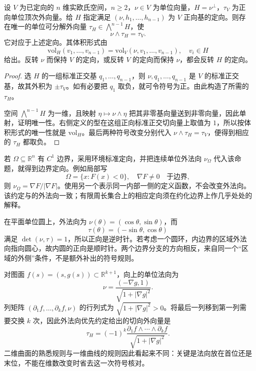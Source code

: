 \begin{proposition}\label{b1:prop:app-b-boundary-orientation}
设 \(V\) 为已定向的 \(n\) 维实欧氏空间，\(n\ge2\)，\(\nu\in V\) 为单位向量，\(H=\nu^\perp\)，\(\tau_V\) 为正向单位顶次外向量。给 \(H\) 指定满足 \((\nu,h_1,\ldots,h_{n-1})\) 为 \(V\) 正向基的定向。则存在唯一的单位可分解外向量
\(\tau_H\in\bigwedge^{n-1}H\)，使
\[
 \nu\wedge\tau_H=\tau_V.
\]
它对应于上述定向。其体积形式由
\[
 \mathrm{vol}_H(v_1,\ldots,v_{n-1})
   =\mathrm{vol}_V(\nu,v_1,\ldots,v_{n-1}),
 \quad v_i\in H
\]
给出。反转 \(\nu\) 而保持 \(V\) 的定向，或反转 \(V\) 的定向而保持 \(\nu\)，都会反转 \(H\) 的定向。
\end{proposition}
\begin{proof}
选 \(H\) 的一组标准正交基 \(q_1,\ldots,q_{n-1}\)，则
\(\nu,q_1,\ldots,q_{n-1}\) 是 \(V\) 的标准正交基，故其外积为 \(\pm\tau_V\)。如有必要把 \(q_1\) 取负，就可令符号为正。由此构造了所需的 \(\tau_H\)。

空间 \(\bigwedge^{n-1}H\) 为一维，且映射 \(\eta\mapsto\nu\wedge\eta\) 把其非零基向量送到非零向量，因此单射，证明唯一性。右侧定义的型在这组正向标准正交切向量上取值为 \(1\)，所以按体积形式的唯一性就是 \(\mathrm{vol}_H\)。最后两种符号改变分别代入 \(\nu\wedge\tau_H=\tau_V\)，便得到相应的 \(\tau_H\) 都取负。
\end{proof}

若 \(\Omega\subseteq\mathbb R^n\) 有 \(C^1\) 边界，采用环境标准定向，并把连续单位外法向 \(\nu_\Omega\) 代入该命题，就得到边界定向。例如局部写
\[
 \Omega=\{x:F(x)<0\},\quad \nabla F\ne0\quad\text{于边界},
\]
则 \(\nu_\Omega=\nabla F/|\nabla F|\)。使用另一个表示同一内部一侧的定义函数，不会改变外法向。该约定与的外法向一致；有限周长集合上的相应定向须在约化边界上作几乎处处的解释。

\ProseParagraphBreak

在平面单位圆上，外法向为
\(\nu(\theta)=(\cos\theta,\sin\theta)\)，而
\[
 \tau(\theta)=(-\sin\theta,\cos\theta)
\]
满足 \(\det(\nu,\tau)=1\)，所以正向是逆时针。若考虑一个圆环，内边界的区域外法向指向圆心，故内圆的正向是顺时针。两个边界分支的方向相反，来自同一个“区域的外侧”条件，不是额外补出的符号规则。

\ProseParagraphBreak

对图面 \(f(s)=(s,g(s))\subset\mathbb R^{k+1}\)，向上的单位法向为
\[
 \nu=\frac{(-\nabla g,1)}{\sqrt{1+|\nabla g|^2}}.
\]
列矩阵 \((\partial_1f,\ldots,\partial_kf,\nu)\) 的行列式为
\(\sqrt{1+|\nabla g|^2}>0\)。将最后一列移到第一列需要交换 \(k\) 次，因此外法向优先约定给出的切向外向量是
\[
 \tau_H=(-1)^k
 \frac{\partial_1f\wedge\cdots\wedge\partial_kf}
      {\sqrt{1+|\nabla g|^2}}.
\]
二维曲面的熟悉规则与一维曲线的规则因此看起来不同：关键是法向放在首位还是末位，不能在维数改变时省去这一次符号核对。


